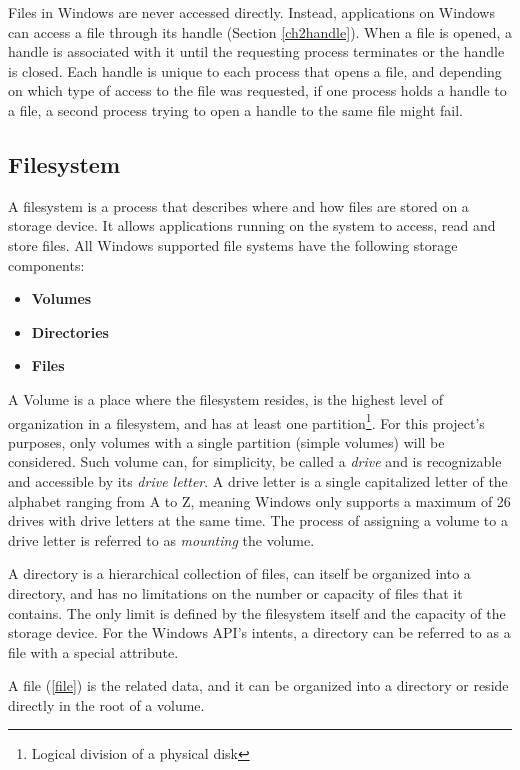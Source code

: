 Files in Windows are never accessed directly. Instead, applications on Windows can access a file through its handle (Section \ref{ch2handle}). When a file is opened, a handle is associated with it until the requesting process terminates or the handle is closed. Each handle is unique to each process that opens a file, and depending on which type of access to the file was requested, if one process holds a handle to a file, a second process trying to open a handle to the same file might fail.\cite{FileHandles}

\subsection*{Filesystem}
A filesystem is a process that describes where and how files are stored on a storage device. It allows applications running on the system to access, read and store files. All Windows supported file systems have the following storage components:\cite{LocalFileSystems}

\begin{itemize}
    \item \textbf{Volumes}
    \item \textbf{Directories}
    \item \textbf{Files}
\end{itemize}

A Volume is a place where the filesystem resides, is the highest level of organization in a filesystem, and has at least one partition\footnote{Logical division of a physical disk}.\cite{WinVolumeMgmt} For this project's purposes, only volumes with a single partition (simple volumes) will be considered. Such volume can, for simplicity, be called a \textit{drive} and is recognizable and accessible by its \textit{drive letter}. 
A drive letter is a single capitalized letter of the alphabet ranging from A to Z, meaning Windows only supports a maximum of 26 drives with drive letters at the same time. The process of assigning a volume to a drive letter is referred to as \textit{mounting} the volume.

A directory is a hierarchical collection of files, can itself be organized into a directory, and has no limitations on the number or capacity of files that it contains. The only limit is defined by the filesystem itself and the capacity of the storage device.\cite{WinDirectoryMgmt} For the Windows API's intents, a directory can be referred to as a file with a special attribute.

A file (\ref{file}) is the related data, and it can be organized into a directory or reside directly in the root of a volume.

